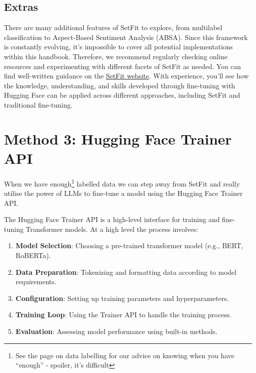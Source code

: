 \documentclass[
  letterpaper,
  DIV=11,
  numbers=noendperiod]{scrreprt}
\providecommand{\tightlist}{%
  \setlength{\itemsep}{0pt}\setlength{\parskip}{0pt}}\usepackage{longtable,booktabs,array}
\begin{document}
\section{Extras}\label{extras}

There are many additional features of SetFit to explore, from multilabel
classification to Aspect-Based Sentiment Analysis (ABSA). Since this
framework is constantly evolving, it's impossible to cover all potential
implementations within this handbook. Therefore, we recommend regularly
checking online resources and experimenting with different facets of
SetFit as needed. You can find well-written guidance on the
\href{https://huggingface.co/docs/setfit/how_to/overview}{SetFit
website}. With experience, you'll see how the knowledge, understanding,
and skills developed through fine-tuning with Hugging Face can be
applied across different approaches, including SetFit and traditional
fine-tuning.

\chapter{Method 3: Hugging Face Trainer
API}\label{method-3-hugging-face-trainer-api}

When we have enough\footnote{See the page on data labelling for our
  advice on knowing when you have ``enough'' - spoiler, it's difficult}
labelled data we can step away from SetFit and really utilise the power
of LLMs to fine-tune a model using the Hugging Face Trainer API.

The Hugging Face Trainer API is a high-level interface for training and
fine-tuning Transformer models. At a high level the process involves:

\begin{enumerate}
\def\labelenumi{\arabic{enumi}.}
\tightlist
\item
  \textbf{Model Selection}: Choosing a pre-trained transformer model
  (e.g., BERT, RoBERTa).
\item
  \textbf{Data Preparation}: Tokenizing and formatting data according to
  model requirements.
\item
  \textbf{Configuration}: Setting up training parameters and
  hyperparameters.
\item
  \textbf{Training Loop}: Using the Trainer API to handle the training
  process.
\item
  \textbf{Evaluation}: Assessing model performance using built-in
  methods.
\end{enumerate}
\end{document}
